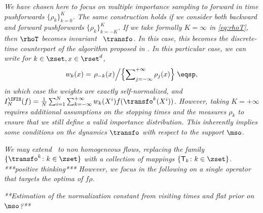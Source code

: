 \begin{remark}\em
We have chosen here to focus on multiple importance sampling to forward in time pushforwards $\{\rho_k\}_{k=0}^K$. The same construction holds if we consider both backward and forward pushforwards $\{\rho_k\}_{k=-K}^K$.
If we take formally $K=\infty$ in \eqref{eq:rhoT}, then $\rhoT$ becomes invariant \wrt\ $\transfo$. In this case, this becomes the discrete-time counterpart of the algorithm proposed in \cite{rotskoff:vanden-eijden:2019}. 
In this particular case, we can write for $k\in\zset, x\in\rset^d$, 
\[
 w_{k}(x) =  \left.  \rho_{-k}(x) \middle / \left\{ \sum\nolimits_{j=-\infty}^{+\infty} \rho_{j}(x) \right\}\right. \eqsp,
\]
in which case the weights are exactly self-normalized, and
$I^{\IFIS}_N(f) =   \tfrac{1}{N} \sum_{i=1}^N \sum_{k=-\infty}^{+\infty} w_k(X^i)  f(\transfo^k(X^i))$.
However, taking $K=+\infty$ requires additional assumptions on the stopping times and the measures $\rho_k$ to ensure that we still define a valid importance distribution. This inherently implies some conditions on the dynamics $\transfo$ with respect to the support $\mso$.   
\end{remark}
\begin{remark}\em
We may extend \IFIS\ to non homogeneous flows, replacing the family $\{\transfo^k\colon k\in\zset\}$ with a collection of mappings $\{\mathsf{T}_k\colon k\in\zset\}$.
***positive thinking***
However, we focus in the following on a single operator that targets the optima of $f\rho$.
\end{remark}

\begin{remark}\em
**Estimation of the normalization constant from visiting times and flat prior on $\mso$?**
\end{remark}

